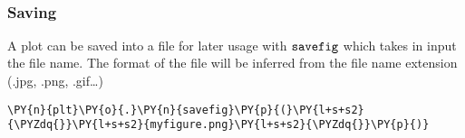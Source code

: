     \begin{center}
    \end{center}
    { \hspace*{\fill} \\}
    
    \hypertarget{saving}{%
\subsubsection{Saving}\label{saving}}

A plot can be saved into a file for later usage with \(\tt{savefig}\)
which takes in input the file name. The format of the file will be
inferred from the file name extension (.jpg, .png, .gif\ldots{})

    \begin{tcolorbox}[breakable, size=fbox, boxrule=1pt, pad at break*=1mm,colback=cellbackground, colframe=cellborder]
\begin{Verbatim}[commandchars=\\\{\}]
\PY{n}{plt}\PY{o}{.}\PY{n}{savefig}\PY{p}{(}\PY{l+s+s2}{\PYZdq{}}\PY{l+s+s2}{myfigure.png}\PY{l+s+s2}{\PYZdq{}}\PY{p}{)}
\end{Verbatim}
\end{tcolorbox}


    
    
    


